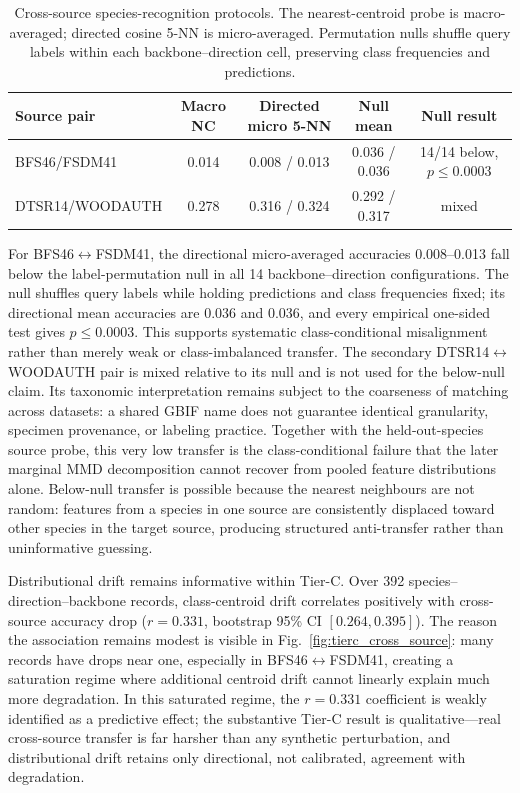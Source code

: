 \documentclass[a4paper,fleqn]{els-cas-templates/cas-sc}
\begin{document}
\begin{table}[pos=htbp]
\centering
\caption{Cross-source species-recognition protocols. The nearest-centroid
probe is macro-averaged; directed cosine 5-NN is micro-averaged. Permutation
nulls shuffle query labels within each backbone--direction cell, preserving
class frequencies and predictions.}
\label{tab:cross_source_protocols}
\small
\begin{tabular}{lcccc}
\toprule
Source pair & Macro NC & Directed micro 5-NN & Null mean & Null result \\
\midrule
BFS46/FSDM41 & 0.014 & 0.008 / 0.013 & 0.036 / 0.036 & 14/14 below, $p\leq0.0003$ \\
DTSR14/WOODAUTH & 0.278 & 0.316 / 0.324 & 0.292 / 0.317 & mixed \\
\bottomrule
\end{tabular}
\end{table}

For BFS46$\leftrightarrow$FSDM41, the directional micro-averaged accuracies
0.008--0.013 fall below the label-permutation null in all 14
backbone--direction configurations. The null shuffles query labels while
holding predictions and class frequencies fixed; its directional mean
accuracies are 0.036 and 0.036, and every empirical one-sided test gives
$p\leq0.0003$. This supports systematic class-conditional misalignment rather
than merely weak or class-imbalanced transfer. The secondary
DTSR14$\leftrightarrow$WOODAUTH pair is mixed relative to its null and is not
used for the below-null claim.
Its taxonomic interpretation remains subject to the coarseness of matching
across datasets: a shared GBIF name does not guarantee identical granularity,
specimen provenance, or labeling practice.
Together with the held-out-species source probe, this very low transfer is the
class-conditional failure that the later marginal MMD decomposition cannot
recover from pooled feature distributions alone.
Below-null transfer is possible because the nearest neighbours are not random:
features from a species in one source are consistently displaced toward other
species in the target source, producing structured anti-transfer rather than
uninformative guessing.

Distributional drift remains informative within Tier-C. Over 392
species--direction--backbone records, class-centroid drift correlates positively
with cross-source accuracy drop ($r=0.331$, bootstrap 95\% CI
$[0.264,0.395]$). The reason the association remains modest is visible in
Fig.~\ref{fig:tierc_cross_source}:
many records have drops near one, especially in BFS46$\leftrightarrow$FSDM41,
creating a saturation regime where additional centroid drift cannot linearly
explain much more degradation.
In this saturated regime, the $r=0.331$ coefficient is weakly identified as a
predictive effect; the substantive Tier-C result is qualitative---real
cross-source transfer is far harsher than any synthetic perturbation, and
distributional drift retains only directional, not calibrated, agreement with
degradation.
\end{document}
